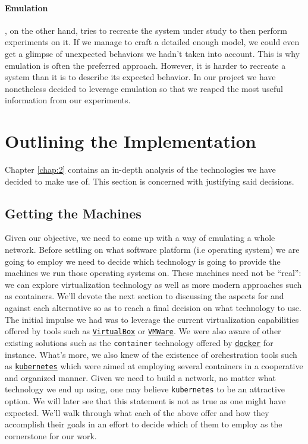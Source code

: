             \paragraph{Emulation}, on the other hand, tries to recreate the system under study to then perform experiments on it. If we manage to craft a detailed enough model, we could even get a glimpse of unexpected behaviors we hadn't taken into account. This is why emulation is often the preferred approach. However, it is harder to recreate a system than it is to describe its expected behavior. In our project we have nonetheless decided to leverage emulation so that we reaped the most useful information from our experiments.\\

    \section{Outlining the Implementation}
        Chapter \ref{chap:2} contains an in-depth analysis of the technologies we have decided to make use of. This section is concerned with justifying said decisions.

        \subsection{Getting the Machines}
            Given our objective, we need to come up with a way of emulating a whole network. Before settling on what software platform (i.e operating system) we are going to employ we need to decide which technology is going to provide the machines we run those operating systems on. These machines need not be ``real'': we can explore virtualization technology as well as more modern approaches such as containers. We'll devote the next section to discussing the aspects for and against each alternative so as to reach a final decision on what technology to use.\\

            The initial impulse we had was to leverage the current virtualization capabilities offered by tools such as \href{https://www.virtualbox.org}{\texttt{VirtualBox}} or \href{https://www.vmware.com}{\texttt{VMWare}}. We were also aware of other existing solutions such as the \texttt{container} technology offered by \href{https://www.docker.com}{\texttt{docker}} for instance. What's more, we also knew of the existence of orchestration tools such as \href{https://kubernetes.io}{\texttt{kubernetes}} which were aimed at employing several containers in a cooperative and organized manner. Given we need to build a network, no matter what technology we end up using, one may believe \texttt{kubernetes} to be an attractive option. We will later see that this statement is not as true as one might have expected. We'll walk through what each of the above offer and how they accomplish their goals in an effort to decide which of them to employ as the cornerstone for our work.

